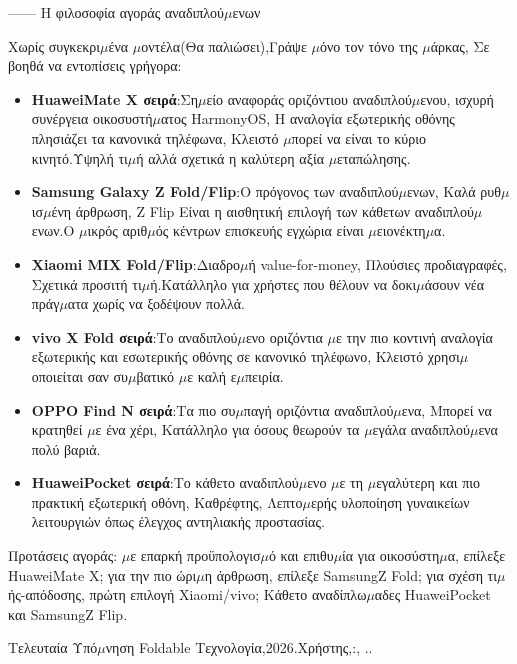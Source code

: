 —— Η φιλοσοφία αγοράς αναδιπλού$\mu$ενων


Χωρίς συγκεκρι$\mu$ένα $\mu$οντέλα(Θα παλιώσει),Γράψε $\mu$όνο τον τόνο της $\mu$άρκας, Σε βοηθά να εντοπίσεις γρήγορα:

\begin{itemize}
  \item \textbf{HuaweiMate X σειρά}:Ση$\mu$είο αναφοράς οριζόντιου αναδιπλού$\mu$ενου, ισχυρή συνέργεια οικοσυστή$\mu$ατος HarmonyOS, Η αναλογία εξωτερικής οθόνης πλησιάζει τα κανονικά τηλέφωνα, Κλειστό $\mu$πορεί να είναι το κύριο κινητό.Υψηλή τι$\mu$ή αλλά σχετικά η καλύτερη αξία $\mu$εταπώλησης.
  \item \textbf{Samsung Galaxy Z Fold/Flip}:Ο πρόγονος των αναδιπλού$\mu$ενων, Καλά ρυθ$\mu$ισ$\mu$ένη άρθρωση, Z Flip Είναι η αισθητική επιλογή των κάθετων αναδιπλού$\mu$ενων.Ο $\mu$ικρός αριθ$\mu$ός κέντρων επισκευής εγχώρια είναι $\mu$ειονέκτη$\mu$α.
  \item \textbf{Xiaomi MIX Fold/Flip}:Διαδρο$\mu$ή value-for-money, Πλούσιες προδιαγραφές, Σχετικά προσιτή τι$\mu$ή.Κατάλληλο για χρήστες που θέλουν να δοκι$\mu$άσουν νέα πράγ$\mu$ατα χωρίς να ξοδέψουν πολλά.
  \item \textbf{vivo X Fold σειρά}:Το αναδιπλού$\mu$ενο οριζόντια $\mu$ε την πιο κοντινή αναλογία εξωτερικής και εσωτερικής οθόνης σε κανονικό τηλέφωνο, Κλειστό χρησι$\mu$οποιείται σαν συ$\mu$βατικό $\mu$ε καλή ε$\mu$πειρία.
  \item \textbf{OPPO Find N σειρά}:Τα πιο συ$\mu$παγή οριζόντια αναδιπλού$\mu$ενα, Μπορεί να κρατηθεί $\mu$ε ένα χέρι, Κατάλληλο για όσους θεωρούν τα $\mu$εγάλα αναδιπλού$\mu$ενα πολύ βαριά.
  \item \textbf{HuaweiPocket σειρά}:Το κάθετο αναδιπλού$\mu$ενο $\mu$ε τη $\mu$εγαλύτερη και πιο πρακτική εξωτερική οθόνη, Καθρέφτης, Λεπτο$\mu$ερής υλοποίηση γυναικείων λειτουργιών όπως έλεγχος αντηλιακής προστασίας.
\end{itemize}

Προτάσεις αγοράς: $\mu$ε επαρκή προϋπολογισ$\mu$ό και επιθυ$\mu$ία για οικοσύστη$\mu$α, επίλεξε HuaweiMate X; για την πιο ώρι$\mu$η άρθρωση, επίλεξε SamsungZ Fold; για σχέση τι$\mu$ής-απόδοσης, πρώτη επιλογή Xiaomi/vivo; Κάθετο αναδίπλω$\mu$αδες HuaweiPocket και SamsungZ Flip.

\begin{tcbinfo}{Τελευταία Υπό$\mu$νηση}
Foldable Τεχνολογία,2026.Χρήστης,:, ..

\end{tcbinfo}
